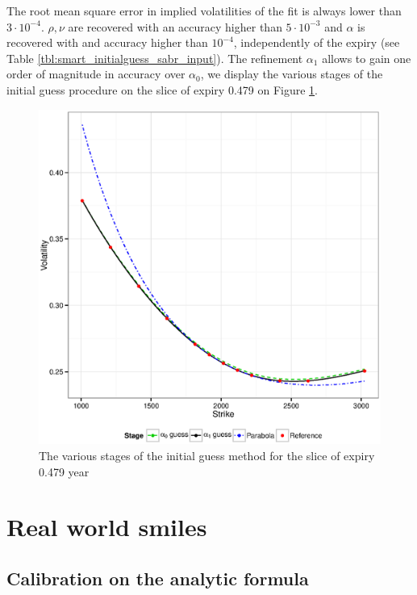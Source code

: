 \documentclass[]{rAMF2e}
\begin{document}
The root mean square error in implied volatilities of the fit is always lower than $3\cdot 10^{-4}$. $\rho, \nu$ are recovered with an accuracy higher than $5\cdot 10^{-3}$ and $\alpha$ is recovered with and accuracy higher than $10^{-4}$, independently of the expiry (see Table \ref{tbl:smart_initialguess_sabr_input}). The refinement $\alpha_1$ allows to gain one order of magnitude in accuracy over $\alpha_0$, we display the various stages of the initial guess procedure on the slice of expiry 0.479 on Figure \ref{fig:smart_initialguess_sabr_input}.
\begin{figure}[htbp]
  \caption{\label{fig:smart_initialguess_sabr_input}The various stages of the initial guess method for the slice of expiry 0.479 year}
\begin{center}
 \includegraphics[width=16cm]{explicit_fit_sabr_0479_beta1.eps}
\end{center}
\end{figure}

\section{Real world smiles}
\subsection{Calibration on the analytic formula}
\end{document}
